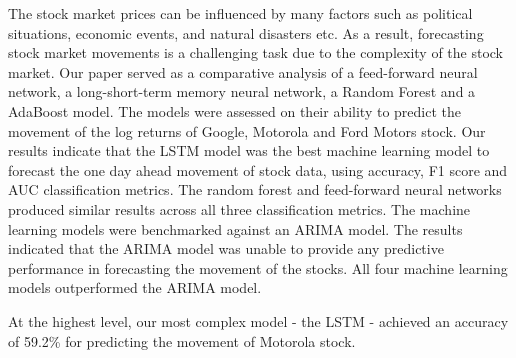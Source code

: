 The stock market prices can be influenced by many factors such as political situations, economic events, and natural disasters etc. As a result, forecasting stock market movements is a challenging task due to the complexity of the stock market. Our paper served as a comparative analysis of a feed-forward neural network, a long-short-term memory neural network, a Random Forest and a AdaBoost model. The models were assessed on their ability to predict the movement of the log returns of Google, Motorola and Ford Motors stock. Our results indicate that the LSTM model was the best machine learning model to forecast the one day ahead movement of stock data, using accuracy, F1 score and AUC classification metrics. The random forest and feed-forward neural networks produced similar results across all three classification metrics. The machine learning models were benchmarked against an ARIMA model. The results indicated that the ARIMA model was unable to provide any predictive performance in forecasting the movement of the stocks. All four machine learning models outperformed the ARIMA model.

At the highest level,  our most complex model - the LSTM - achieved an accuracy of 59.2\% for predicting the movement of Motorola stock. 


